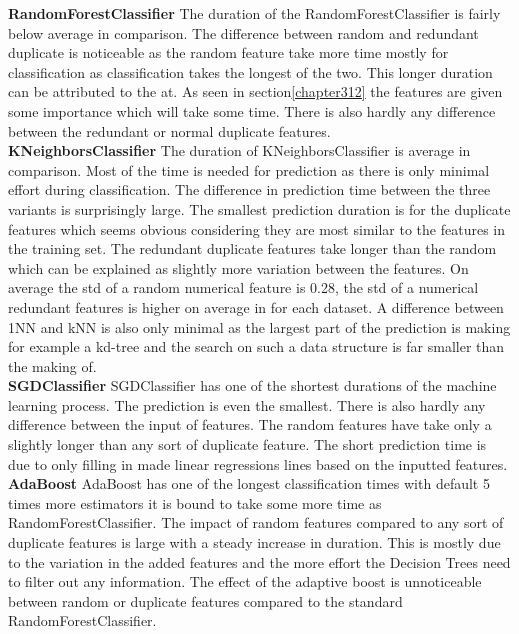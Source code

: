 \documentclass[a4paper,10pt]{article}
\begin{document}
\textbf{RandomForestClassifier} The duration of the RandomForestClassifier is fairly below average in comparison. The difference between random and redundant duplicate is noticeable as the random feature take more time mostly for classification as classification takes the longest of the two. This longer duration can be attributed to the at. As seen in section\ref{chapter312} the features are given some importance which will take some time. There is also hardly any difference between the redundant or normal duplicate features.  \\

\textbf{KNeighborsClassifier} The duration of KNeighborsClassifier is average in comparison. Most of the time is needed for prediction as there is only minimal effort during classification. The difference in prediction time between the three variants is surprisingly large. The smallest prediction duration is for the duplicate features which seems obvious considering they are most similar to the features in the training set. The redundant duplicate features take longer than the random which can be explained as slightly more variation between the features. On average the std of a random numerical feature is 0.28, the std of a numerical redundant features is higher on average in for each dataset. A difference between 1NN and kNN is also only minimal as the largest part of the prediction is making for example a kd-tree and the search on such a data structure is far smaller than the making of.\\

\textbf{SGDClassifier} SGDClassifier has one of the shortest durations of the machine learning process. The prediction is even the smallest. There is also hardly any difference between the input of features. The random features have take only  a slightly longer than any sort of duplicate feature. The short prediction time is due to only filling in made linear regressions lines based on the inputted features. \\

\textbf{AdaBoost} AdaBoost has one of the longest classification times with default 5 times more estimators it is bound to take some more time as RandomForestClassifier. The impact of random features compared to any sort of duplicate features is large with a steady increase in duration. This is mostly due to the variation in the added features and the more effort the Decision Trees need to filter out any information. The effect of the adaptive boost is unnoticeable between random or duplicate features compared to the standard RandomForestClassifier.  \\
\end{document}
